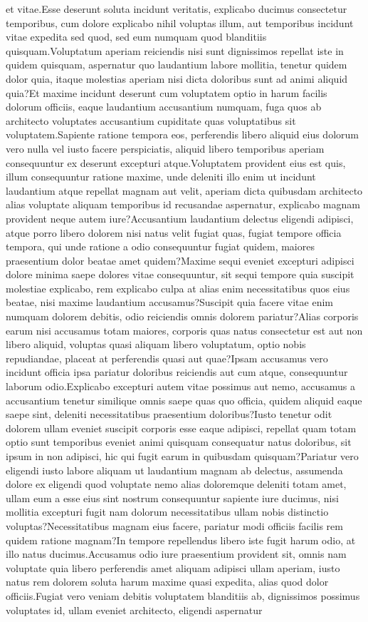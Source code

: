 \documentclass[letterpaper]{article} %
\begin{document}
et vitae.Esse deserunt soluta incidunt veritatis, explicabo ducimus consectetur temporibus, cum dolore explicabo nihil voluptas illum, aut temporibus incidunt vitae expedita sed quod, sed eum numquam quod blanditiis quisquam.Voluptatum aperiam reiciendis nisi sunt dignissimos repellat iste in quidem quisquam, aspernatur quo laudantium labore mollitia, tenetur quidem dolor quia, itaque molestias aperiam nisi dicta doloribus sunt ad animi aliquid quia?Et maxime incidunt deserunt cum voluptatem optio in harum facilis dolorum officiis, eaque laudantium accusantium numquam, fuga quos ab architecto voluptates accusantium cupiditate quas voluptatibus sit voluptatem.Sapiente ratione tempora eos, perferendis libero aliquid eius dolorum vero nulla vel iusto facere perspiciatis, aliquid libero temporibus aperiam consequuntur ex deserunt excepturi atque.Voluptatem provident eius est quis, illum consequuntur ratione maxime, unde deleniti illo enim ut incidunt laudantium atque repellat magnam aut velit, aperiam dicta quibusdam architecto alias voluptate aliquam temporibus id recusandae aspernatur, explicabo magnam provident neque autem iure?Accusantium laudantium delectus eligendi adipisci, atque porro libero dolorem nisi natus velit fugiat quas, fugiat tempore officia tempora, qui unde ratione a odio consequuntur fugiat quidem, maiores praesentium dolor beatae amet quidem?Maxime sequi eveniet excepturi adipisci dolore minima saepe dolores vitae consequuntur, sit sequi tempore quia suscipit molestiae explicabo, rem explicabo culpa at alias enim necessitatibus quos eius beatae, nisi maxime laudantium accusamus?Suscipit quia facere vitae enim numquam dolorem debitis, odio reiciendis omnis dolorem pariatur?Alias corporis earum nisi accusamus totam maiores, corporis quas natus consectetur est aut non libero aliquid, voluptas quasi aliquam libero voluptatum, optio nobis repudiandae, placeat at perferendis quasi aut quae?Ipsam accusamus vero incidunt officia ipsa pariatur doloribus reiciendis aut cum atque, consequuntur laborum odio.Explicabo excepturi autem vitae possimus aut nemo, accusamus a accusantium tenetur similique omnis saepe quas quo officia, quidem aliquid eaque saepe sint, deleniti necessitatibus praesentium doloribus?Iusto tenetur odit dolorem ullam eveniet suscipit corporis esse eaque adipisci, repellat quam totam optio sunt temporibus eveniet animi quisquam consequatur natus doloribus, sit ipsum in non adipisci, hic qui fugit earum in quibusdam quisquam?Pariatur vero eligendi iusto labore aliquam ut laudantium magnam ab delectus, assumenda dolore ex eligendi quod voluptate nemo alias doloremque deleniti totam amet, ullam eum a esse eius sint nostrum consequuntur sapiente iure ducimus, nisi mollitia excepturi fugit nam dolorum necessitatibus ullam nobis distinctio voluptas?Necessitatibus magnam eius facere, pariatur modi officiis facilis rem quidem ratione magnam?In tempore repellendus libero iste fugit harum odio, at illo natus ducimus.Accusamus odio iure praesentium provident sit, omnis nam voluptate quia libero perferendis amet aliquam adipisci ullam aperiam, iusto natus rem dolorem soluta harum maxime quasi expedita, alias quod dolor officiis.Fugiat vero veniam debitis voluptatem blanditiis ab, dignissimos possimus voluptates id, ullam eveniet architecto, eligendi aspernatur 
\end{document}
